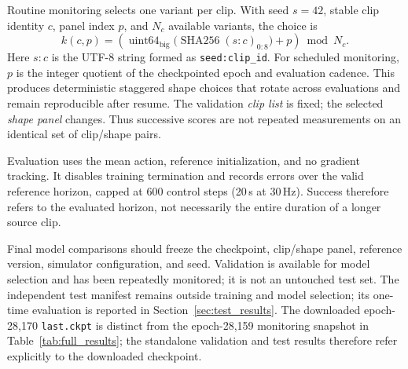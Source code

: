\documentclass[11pt]{article}
\begin{document}
Routine monitoring selects one variant per clip. With seed $s=42$, stable
clip identity $c$, panel index $p$, and $N_c$ available variants, the choice is
\begin{equation}
    k(c,p) =
    \left(
       \operatorname{uint64}_{\mathrm{big}}
       \bigl(\operatorname{SHA256}(s\!:\!c)_{0:8}\bigr)
       +p
    \right)\bmod N_c .
    \label{eq:shape_panel}
\end{equation}
Here $s\!:\!c$ is the UTF-8 string formed as \texttt{seed:clip\_id}.
For scheduled monitoring, $p$ is the integer quotient of the checkpointed
epoch and evaluation cadence. This produces deterministic staggered shape
choices that rotate across evaluations and remain reproducible after resume.
The validation \emph{clip list} is fixed; the selected \emph{shape panel}
changes. Thus successive scores are not repeated measurements on an
identical set of clip/shape pairs.

Evaluation uses the mean action, reference initialization, and no gradient
tracking. It disables training termination and records errors over the
valid reference horizon, capped at 600 control steps (20\,s at 30\,Hz).
Success therefore refers to the evaluated horizon, not necessarily the
entire duration of a longer source clip.

Final model comparisons should freeze the checkpoint, clip/shape panel,
reference version, simulator configuration, and seed. Validation is available
for model selection and has been repeatedly monitored; it is not an untouched
test set. The independent test manifest remains outside training and model
selection; its one-time evaluation is reported in
Section~\ref{sec:test_results}. The downloaded epoch-28,170
\texttt{last.ckpt} is distinct from the epoch-28,159 monitoring snapshot
in Table~\ref{tab:full_results}; the standalone validation and test results
therefore refer explicitly to the downloaded checkpoint.
\end{document}

